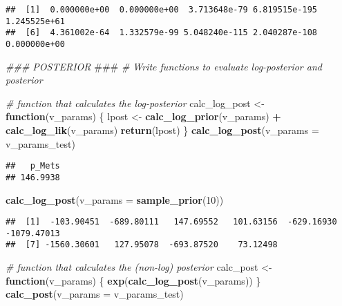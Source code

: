 \documentclass[
]{article}
\newenvironment{Shaded}{\begin{snugshade}}{\end{snugshade}}
\newcommand{\AlertTok}[1]{\textcolor[rgb]{0.94,0.16,0.16}{#1}}
\newcommand{\CommentTok}[1]{\textcolor[rgb]{0.56,0.35,0.01}{\textit{#1}}}
\newcommand{\ControlFlowTok}[1]{\textcolor[rgb]{0.13,0.29,0.53}{\textbf{#1}}}
\newcommand{\DataTypeTok}[1]{\textcolor[rgb]{0.13,0.29,0.53}{#1}}
\newcommand{\DecValTok}[1]{\textcolor[rgb]{0.00,0.00,0.81}{#1}}
\newcommand{\KeywordTok}[1]{\textcolor[rgb]{0.13,0.29,0.53}{\textbf{#1}}}
\newcommand{\NormalTok}[1]{#1}
\newcommand{\OperatorTok}[1]{\textcolor[rgb]{0.81,0.36,0.00}{\textbf{#1}}}
\newcommand{\StringTok}[1]{\textcolor[rgb]{0.31,0.60,0.02}{#1}}
\begin{document}
\begin{verbatim}
##  [1]  0.000000e+00  0.000000e+00  3.713648e-79 6.819515e-195  1.245525e+61
##  [6]  4.361002e-64  1.332579e-99 5.048240e-115 2.040287e-108  0.000000e+00
\end{verbatim}

\begin{Shaded}
\begin{Highlighting}[]
\CommentTok{###  POSTERIOR  }\AlertTok{###}
\CommentTok{# Write functions to evaluate log-posterior and posterior}

\CommentTok{# function that calculates the log-posterior}
\NormalTok{calc_log_post <-}\StringTok{ }\ControlFlowTok{function}\NormalTok{(v_params) \{ }
\NormalTok{  lpost <-}\StringTok{ }\KeywordTok{calc_log_prior}\NormalTok{(v_params) }\OperatorTok{+}\StringTok{ }\KeywordTok{calc_log_lik}\NormalTok{(v_params)}
  \KeywordTok{return}\NormalTok{(lpost) }
\NormalTok{\}}
\KeywordTok{calc_log_post}\NormalTok{(}\DataTypeTok{v_params =}\NormalTok{ v_params_test)}
\end{Highlighting}
\end{Shaded}

\begin{verbatim}
##   p_Mets 
## 146.9938
\end{verbatim}

\begin{Shaded}
\begin{Highlighting}[]
\KeywordTok{calc_log_post}\NormalTok{(}\DataTypeTok{v_params =} \KeywordTok{sample_prior}\NormalTok{(}\DecValTok{10}\NormalTok{))}
\end{Highlighting}
\end{Shaded}

\begin{verbatim}
##  [1]  -103.90451  -689.80111   147.69552   101.63156  -629.16930 -1079.47013
##  [7] -1560.30601   127.95078  -693.87520    73.12498
\end{verbatim}

\begin{Shaded}
\begin{Highlighting}[]
\CommentTok{# function that calculates the (non-log) posterior}
\NormalTok{calc_post <-}\StringTok{ }\ControlFlowTok{function}\NormalTok{(v_params) \{ }
  \KeywordTok{exp}\NormalTok{(}\KeywordTok{calc_log_post}\NormalTok{(v_params)) }
\NormalTok{\}}
\KeywordTok{calc_post}\NormalTok{(}\DataTypeTok{v_params =}\NormalTok{ v_params_test)}
\end{Highlighting}
\end{Shaded}
\end{document}
